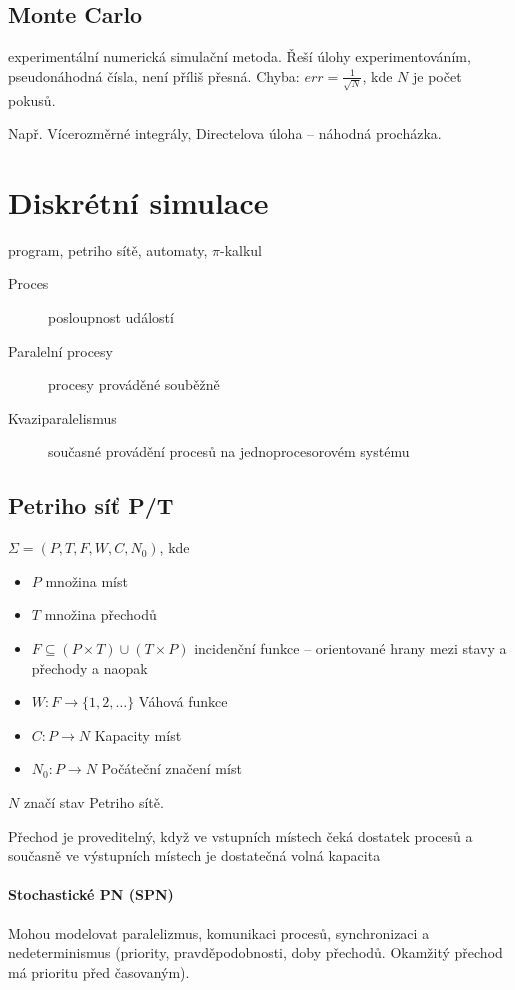 \documentclass[a4paper, 11pt]{report}
\begin{document}
\subsection{Monte Carlo}

experimentální numerická simulační metoda. Řeší úlohy experimentováním, pseudonáhodná čísla, není příliš přesná. Chyba: $err = \frac{1}{\sqrt{N}}$, kde $N$ je počet pokusů.

Např. Vícerozměrné integrály, Directelova úloha -- náhodná procházka.

\section{Diskrétní simulace}

program, petriho sítě, automaty, $\pi$-kalkul

\begin{description}
	\item[Proces] posloupnost událostí
	\item[Paralelní procesy] procesy prováděné souběžně
	\item[Kvaziparalelismus] současné provádění procesů na jednoprocesorovém systému
\end{description}

\subsection{Petriho síť P/T}
$\Sigma = (P, T, F, W, C, N_0)$, kde
\begin{itemize}
	\item $P$ množina míst
	\item $T$ množina přechodů 
	\item $F \subseteq (P \times T) \cup (T \times P)$ incidenční funkce -- orientované hrany mezi stavy a přechody a naopak
	\item $W : F \to \{1, 2, \dots \}$ Váhová funkce
	\item $C : P \to N$ Kapacity míst
	\item $N_0: P \to N$ Počáteční značení míst
\end{itemize}

$N$ značí stav Petriho sítě.

Přechod je proveditelný, když ve vstupních místech čeká dostatek procesů a současně ve výstupních místech je dostatečná volná kapacita

\paragraph{Stochastické PN (SPN)} Mohou modelovat paralelizmus, komunikaci procesů, synchronizaci a nedeterminismus (priority, pravděpodobnosti, doby přechodů. Okamžitý přechod má prioritu před časovaným).
\end{document}
